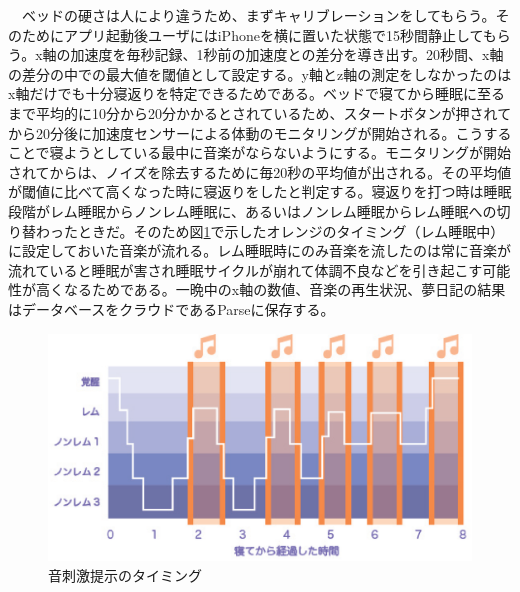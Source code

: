 　ベッドの硬さは人により違うため、まずキャリブレーションをしてもらう。そのためにアプリ起動後ユーザにはiPhoneを横に置いた状態で15秒間静止してもらう。x軸の加速度を毎秒記録、1秒前の加速度との差分を導き出す。20秒間、x軸の差分の中での最大値を閾値として設定する。y軸とz軸の測定をしなかったのはx軸だけでも十分寝返りを特定できるためである。ベッドで寝てから睡眠に至るまで平均的に10分から20分かかるとされているため、スタートボタンが押されてから20分後に加速度センサーによる体動のモニタリングが開始される。こうすることで寝ようとしている最中に音楽がならないようにする。モニタリングが開始されてからは、ノイズを除去するために毎20秒の平均値が出される。その平均値が閾値に比べて高くなった時に寝返りをしたと判定する。寝返りを打つ時は睡眠段階がレム睡眠からノンレム睡眠に、あるいはノンレム睡眠からレム睡眠への切り替わったときだ\cite{negaeri}。そのため図\ref{melodyGraph}で示したオレンジのタイミング（レム睡眠中）に設定しておいた音楽が流れる。レム睡眠時にのみ音楽を流したのは常に音楽が流れていると睡眠が害され睡眠サイクルが崩れて体調不良などを引き起こす可能性が高くなるためである。一晩中のx軸の数値、音楽の再生状況、夢日記の結果はデータベースをクラウドであるParseに保存する。
\begin{figure}[htbp]
\begin{center}
\includegraphics[width=15cm]{eps/remNonrem.eps}
\caption{音刺激提示のタイミング}
\label{melodyGraph}
\end{center}
\end{figure}

